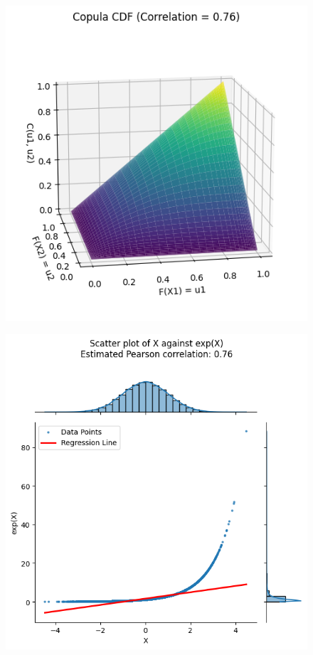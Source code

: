 \begin{figure}
\begin{minipage}{0.25\textwidth}
        \label{fig:exponentialDependenceScatterProb}
    \end{minipage}
    \vfill
    \begin{minipage}{0.25\textwidth}
        \centering
        \includegraphics[width=\textwidth]{3Theory/pictures/CorrelationEstimationExponential.png}
        \label{fig:CorrelationEstimationExponential}
    \end{minipage}
    \hfill
    \begin{minipage}{0.25\textwidth}
        \centering
        \includegraphics[width=\textwidth]{3Theory/pictures/exponentialDependenceScatterRet.png}

\end{minipage}
\end{figure}
